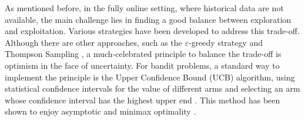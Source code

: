  
As mentioned before, in the fully online setting, where historical data are not available, the main challenge lies in finding a good balance between exploration and exploitation. Various strategies have been developed to address this trade-off. Although there are other approaches, such as the $\varepsilon$-greedy strategy and Thompson Sampling \citep{agrawal2012analysis}, a much-celebrated principle to balance the trade-off is optimism in the face of uncertainty.  For bandit problems, a standard way to implement the principle is the Upper Confidence Bound (UCB) algorithm, using statistical confidence intervals for the value of different arms and selecting an arm whose confidence interval has the highest upper end \citep{auer2010ucb}. This method has been shown to enjoy asymptotic and minimax optimality \citep{lattimore2020bandit}.


